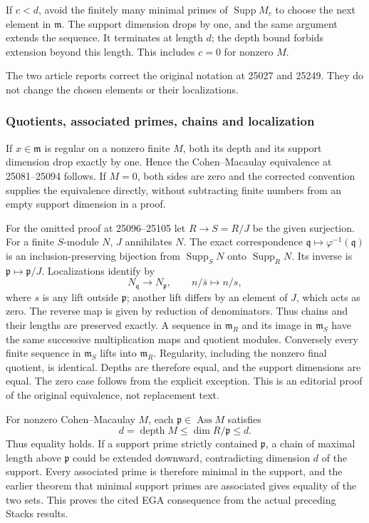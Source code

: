 If \(c<d\), avoid the finitely many minimal primes of \(\operatorname{Supp}M_c\) to choose the next element in \(\mathfrak m\). The support dimension drops by one, and the same argument extends the sequence. It terminates at length \(d\); the depth bound forbids extension beyond this length. This includes \(c=0\) for nonzero \(M\).

The two article reports correct the original notation at 25027 and 25249. They do not change the chosen elements or their localizations.

\subsubsection{Quotients, associated primes, chains and localization}\label{quotients-associated-primes-chains-and-localization}

If \(x\in\mathfrak m\) is regular on a nonzero finite \(M\), both its depth and its support dimension drop exactly by one. Hence the Cohen--Macaulay equivalence at 25081--25094 follows. If \(M=0\), both sides are zero and the corrected convention supplies the equivalence directly, without subtracting finite numbers from an empty support dimension in a proof.

For the omitted proof at 25096--25105 let \(R\to S=R/J\) be the given surjection. For a finite \(S\)-module \(N\), \(J\) annihilates \(N\). The exact correspondence \(\mathfrak q\mapsto\varphi^{-1}(\mathfrak q)\) is an inclusion-preserving bijection from \(\operatorname{Supp}_S N\) onto \(\operatorname{Supp}_R N\). Its inverse is \(\mathfrak p\mapsto\mathfrak p/J\). Localizations identify by \[
 N_{\mathfrak q}\longrightarrow N_{\mathfrak p},\qquad n/\bar s\longmapsto n/s,
\] where \(s\) is any lift outside \(\mathfrak p\); another lift differs by an element of \(J\), which acts as zero. The reverse map is given by reduction of denominators. Thus chains and their lengths are preserved exactly. A sequence in \(\mathfrak m_R\) and its image in \(\mathfrak m_S\) have the same successive multiplication maps and quotient modules. Conversely every finite sequence in \(\mathfrak m_S\) lifts into \(\mathfrak m_R\). Regularity, including the nonzero final quotient, is identical. Depths are therefore equal, and the support dimensions are equal. The zero case follows from the explicit exception. This is an editorial proof of the original equivalence, not replacement text.

For nonzero Cohen--Macaulay \(M\), each \(\mathfrak p\in\operatorname{Ass}M\) satisfies \[
 d=\operatorname{depth}M\le\dim R/\mathfrak p\le d.
\] Thus equality holds. If a support prime strictly contained \(\mathfrak p\), a chain of maximal length above \(\mathfrak p\) could be extended downward, contradicting dimension \(d\) of the support. Every associated prime is therefore minimal in the support, and the earlier theorem that minimal support primes are associated gives equality of the two sets. This proves the cited EGA consequence from the actual preceding Stacks results.

